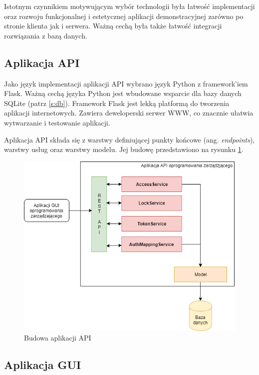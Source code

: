        	Istotnym czynnikiem motywującym wybór technologii była łatwość implementacji oraz rozwoju funkcjonalnej i estetycznej aplikacji demonstracyjnej zarówno po stronie klienta jak i serwera. Ważną cechą była także łatwość integracji rozwiązania z bazą danych.

       	\subsection{Aplikacja API}

			Jako język implementacji aplikacji API wybrano język Python z framework'iem Flask. Ważną cechą języka Python jest wbudowane wsparcie dla bazy danych SQLite (patrz \ref{s:db}). Framework Flask jest lekką platformą do tworzenia aplikacji internetowych. Zawiera deweloperski serwer WWW, co znacznie ułatwia wytwarzanie i testowanie aplikacji.

			Aplikacja API składa się z warstwy definiującej punkty końcowe (ang. \textit{endpoints}), warstwy usług oraz warstwy modelu. Jej budowę przedstawiono na rysunku \ref{fig:api}.

			\begin{figure}[]
            	\centering
	            \includegraphics[width=\textwidth]{chapters/images/uslugi.png}
	            \caption{Budowa aplikacji API}
	            \label{fig:api}
	        \end{figure}

		\subsection{Aplikacja GUI}

